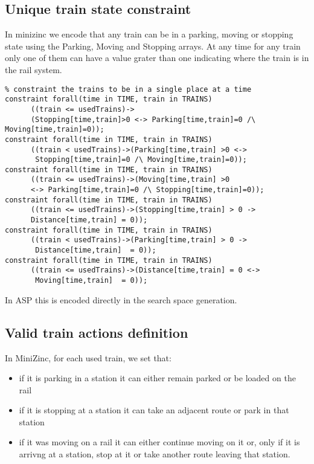 \documentclass[11pt]{article}
\begin{document}
\subsection{Unique train state constraint}

In minizinc we encode that any train can be in a parking, moving or stopping state using
the Parking, Moving and Stopping arrays. At any time for any train only one of them
can have a value grater than one indicating where the train is in the rail system.

\begin{verbatim}
% constraint the trains to be in a single place at a time
constraint forall(time in TIME, train in TRAINS)
      ((train <= usedTrains)->
      (Stopping[time,train]>0 <-> Parking[time,train]=0 /\ Moving[time,train]=0));
constraint forall(time in TIME, train in TRAINS)
      ((train < usedTrains)->(Parking[time,train] >0 <->
       Stopping[time,train]=0 /\ Moving[time,train]=0));
constraint forall(time in TIME, train in TRAINS)
      ((train <= usedTrains)->(Moving[time,train] >0 
      <-> Parking[time,train]=0 /\ Stopping[time,train]=0));
constraint forall(time in TIME, train in TRAINS)
      ((train <= usedTrains)->(Stopping[time,train] > 0 -> 
      Distance[time,train] = 0));
constraint forall(time in TIME, train in TRAINS)
      ((train < usedTrains)->(Parking[time,train] > 0 ->
       Distance[time,train]  = 0));
constraint forall(time in TIME, train in TRAINS)
      ((train <= usedTrains)->(Distance[time,train] = 0 <->
       Moving[time,train]  = 0));     
\end{verbatim}

In ASP this is encoded directly in the search space generation.

\subsection{Valid train actions definition}

In MiniZinc, for each used train, we set that:

\begin{itemize}
\item if it is parking in a station it can either remain parked or be loaded on the rail
\item if it is stopping at a station it can take an adjacent route or park in that station 
\item if it was moving on a rail it can either continue 
moving on it or, only if it is arrivng at a station, stop at it or take another route 
leaving that station.
\end{itemize}
\end{document}
